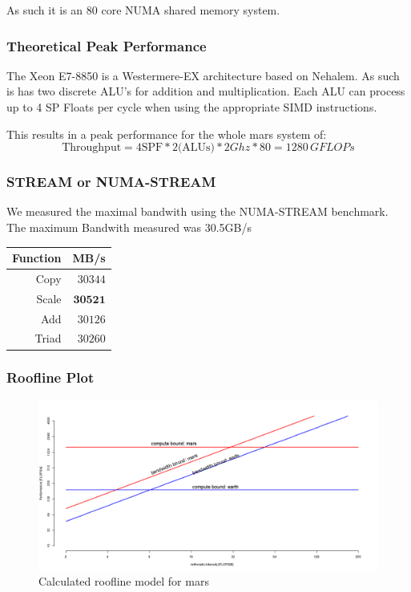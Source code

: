 As such it is an 80 core NUMA shared memory system.

\subsubsection{Theoretical Peak Performance}

The Xeon E7-8850 is a Westermere-EX architecture based on Nehalem.\cite{wikichip}
As such is has two discrete ALU's for addition and multiplication.
Each ALU can process up to 4 SP Floats per cycle when using the appropriate SIMD instructions.\cite{agnerorg}

This results in a peak performance for the whole mars system of:
$$\text{Throughput} = 4 \text{SPF} * 2 \text{(ALUs)} * 2 Ghz * 80 = 1280 \, GFLOPs$$

\subsubsection{STREAM or NUMA-STREAM}

We measured the maximal bandwith using the NUMA-STREAM benchmark.
The maximum Bandwith measured was 30.5GB/s

\begin{center}
\begin{tabular}{|r|r|}
	\hline
	Function & MB/s    \\ \hline
	Copy     & $30344$ \\ \hline
	Scale    & $\pmb{30521}$ \\ \hline
	Add      & $30126$ \\ \hline
	Triad    & $30260$ \\ \hline
\end{tabular}
\end{center}

\subsubsection{Roofline Plot}

\begin{figure}[]
	\centering
	\includegraphics[width=.5\linewidth]{figures/placeholder}
	\caption{Calculated roofline model for mars}
	\label{fig:runtime}
\end{figure}

